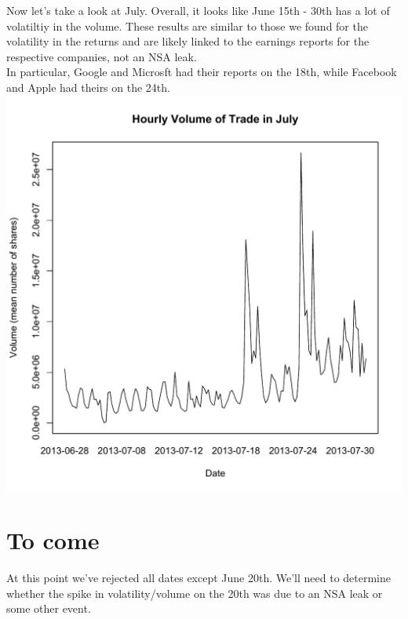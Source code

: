 \documentclass[11pt]{amsart}
\begin{document}
\newpage

Now let's take a look at July. Overall, it looks like June 15th - 30th has a lot of volatiltiy in the volume. These results are similar to those we found for the volatility in the returns and are likely linked to the earnings reports for the respective companies, not an NSA leak. \\

In particular, Google and Microsft had their reports on the 18th, while Facebook and Apple had theirs on the 24th. \\

\includegraphics[scale = 0.5]{july_volume.pdf} \\


\newpage
\section{To come}

At this point we've rejected all dates except June 20th. We'll need to determine whether the spike in volatility/volume on the 20th was due to an NSA leak or some other event.  \\
\end{document}
